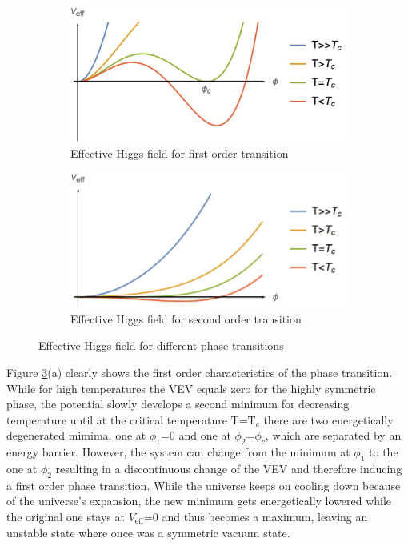 \begin{figure}[H]
	\centering
	\begin{subfigure}{0.7\textwidth}
		\includegraphics[width=\linewidth]{Images/Higgs1}
		\caption{Effective Higgs field for first order transition}
		\label{fig:higgs1}	
	\end{subfigure}
	\begin{subfigure}{0.7\textwidth}
		\includegraphics[width=\linewidth]{Images/Higgs2}
		\caption{Effective Higgs field for second order transition}
		\label{fig:higgs2}
	\end{subfigure}
	\caption{Effective Higgs field for different phase transitions}
	\label{fig:higgs}
\end{figure}
\noindent
Figure \ref{fig:higgs}(a) clearly shows the first order characteristics of the phase transition. While for high temperatures the VEV equals zero for the highly symmetric phase, the potential slowly develops a second minimum for decreasing temperature until at the critical temperature T=T$_c$ there are two energetically degenerated mimima, one at $\phi_1$=0 and one at $\phi_2$=$\phi_c$, which are separated by an energy barrier. However, the system can change from the minimum at $\phi_1$ to the one at $\phi_2$ resulting in a discontinuous change of the VEV and therefore inducing a first order phase transition. While the universe keeps on cooling down because of the universe's expansion, the new minimum gets energetically lowered while the original one stays at $V_\text{eff}$=0 and thus becomes a maximum, leaving an unstable state where once was a symmetric vacuum state.\newline\indent
